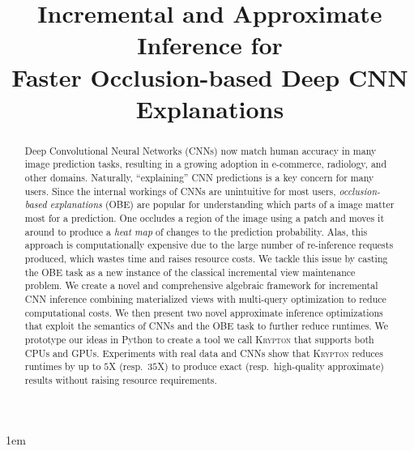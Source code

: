 \documentclass[10pt, sigconf]{acmart}
\begin{document}
\emergencystretch 1em

\title{Incremental and Approximate Inference for\\Faster Occlusion-based Deep CNN Explanations}



\begin{abstract}
Deep Convolutional Neural Networks (CNNs) now match human accuracy in many image prediction tasks, resulting in a growing adoption in e-commerce, radiology, and other domains. Naturally, ``explaining'' CNN predictions is a key concern for many users. Since the internal workings of CNNs are unintuitive for most users, \textit{occlusion-based explanations} (OBE) are popular for understanding which parts of a image matter most for a prediction. One occludes a region of the image using a patch and moves it around to produce a \textit{heat map} of changes to the prediction probability. Alas, this approach is computationally expensive due to the large number of re-inference requests produced, which wastes time and raises resource costs. We tackle this issue by casting the OBE task as a new instance of the classical incremental view maintenance problem. We create a novel and comprehensive algebraic framework for incremental CNN inference combining materialized views with multi-query optimization to reduce computational costs. We then present two novel approximate inference optimizations that exploit the semantics of CNNs and the OBE task to further reduce runtimes. We prototype our ideas in Python to create a tool we call \textsc{Krypton} that supports both CPUs and GPUs. Experiments with real data and CNNs show that \textsc{Krypton} reduces runtimes by up to $5$X (resp.~$35$X) to produce exact (resp.~high-quality approximate) results without raising resource requirements.
\end{abstract}

\maketitle



% 






\end{document}

